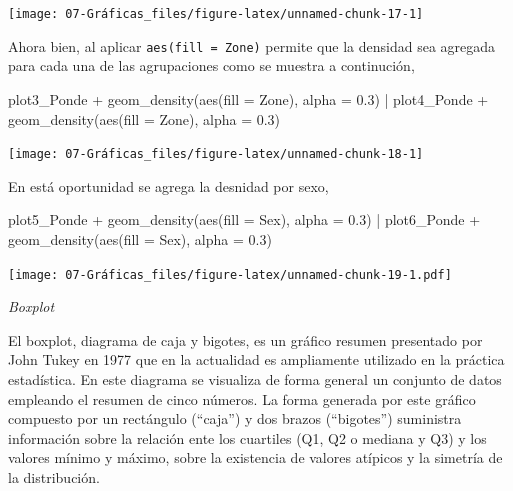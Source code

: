 \documentclass[
  12pt,
]{book}
\newenvironment{Shaded}{\begin{snugshade}}{\end{snugshade}}
\newcommand{\AttributeTok}[1]{\textcolor[rgb]{0.77,0.63,0.00}{#1}}
\newcommand{\FloatTok}[1]{\textcolor[rgb]{0.00,0.00,0.81}{#1}}
\newcommand{\FunctionTok}[1]{\textcolor[rgb]{0.00,0.00,0.00}{#1}}
\newcommand{\NormalTok}[1]{#1}
\newcommand{\SpecialCharTok}[1]{\textcolor[rgb]{0.00,0.00,0.00}{#1}}
\begin{document}
\begin{center}\texttt{[image: 07-Gráficas\_files/figure-latex/unnamed-chunk-17-1]} \end{center}

Ahora bien, al aplicar \texttt{aes(fill\ =\ Zone)} permite que la densidad sea agregada para cada una de las agrupaciones como se muestra a continución,

\begin{Shaded}
\begin{Highlighting}[]
\NormalTok{plot3\_Ponde }\SpecialCharTok{+} \FunctionTok{geom\_density}\NormalTok{(}\FunctionTok{aes}\NormalTok{(}\AttributeTok{fill =}\NormalTok{ Zone), }\AttributeTok{alpha =} \FloatTok{0.3}\NormalTok{) }\SpecialCharTok{|}
\NormalTok{  plot4\_Ponde }\SpecialCharTok{+} \FunctionTok{geom\_density}\NormalTok{(}\FunctionTok{aes}\NormalTok{(}\AttributeTok{fill =}\NormalTok{ Zone), }\AttributeTok{alpha =} \FloatTok{0.3}\NormalTok{)}
\end{Highlighting}
\end{Shaded}

\begin{center}\texttt{[image: 07-Gráficas\_files/figure-latex/unnamed-chunk-18-1]} \end{center}

En está oportunidad se agrega la desnidad por sexo,

\begin{Shaded}
\begin{Highlighting}[]
\NormalTok{plot5\_Ponde }\SpecialCharTok{+} \FunctionTok{geom\_density}\NormalTok{(}\FunctionTok{aes}\NormalTok{(}\AttributeTok{fill =}\NormalTok{ Sex), }\AttributeTok{alpha =} \FloatTok{0.3}\NormalTok{) }\SpecialCharTok{|}
\NormalTok{  plot6\_Ponde }\SpecialCharTok{+} \FunctionTok{geom\_density}\NormalTok{(}\FunctionTok{aes}\NormalTok{(}\AttributeTok{fill =}\NormalTok{ Sex), }\AttributeTok{alpha =} \FloatTok{0.3}\NormalTok{)}
\end{Highlighting}
\end{Shaded}

\texttt{[image: 07-Gráficas\_files/figure-latex/unnamed-chunk-19-1.pdf]}

\emph{Boxplot}

El boxplot, diagrama de caja y bigotes, es un gráfico resumen presentado por John Tukey en 1977 que en la actualidad es ampliamente utilizado en la práctica estadística. En este diagrama se visualiza de forma general un conjunto de datos empleando el resumen de cinco números. La forma generada por este gráfico compuesto por un rectángulo (``caja'') y dos brazos (``bigotes'') suministra información sobre la relación ente los cuartiles (Q1, Q2 o mediana y Q3) y los valores mínimo y máximo, sobre la existencia de valores atípicos y la simetría
de la distribución.
\end{document}
